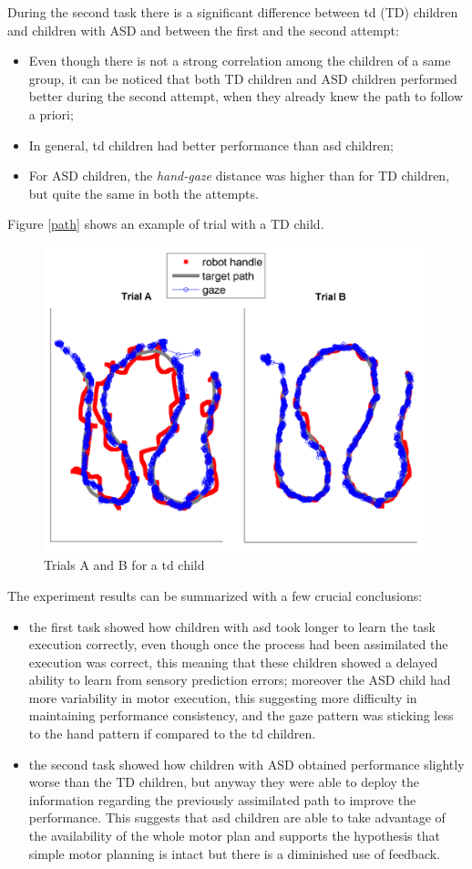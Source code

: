\documentclass[12pt,journal,draftclsnofoot,onecolumn]{IEEEtran}
\makeatletter
\let\origsubsubsection\subsubsection
\renewcommand\subsubsection{\@ifstar{\starsubsubsection}{\nostarsubsubsection}}
\newcommand\nostarsubsubsection[1]
{\subsubsectionprelude\origsubsubsection{#1}}
\newcommand\subsubsectionprelude{%
  \vspace{6pt}
}
\makeatother
\begin{document}
During the second task there is a significant difference between \gls{td} (TD) children and children with ASD and between the first and the second attempt:
\begin{itemize}
\item Even though there is not a strong correlation among the children of a same group, it can be noticed that both TD children and ASD children performed better during the second attempt, when they already knew the path to follow a priori;
\item In general, \gls{td} children had better performance than \gls{asd} children;
\item For ASD children, the \textit{hand-gaze} distance was higher than for TD children, but quite the same in both the attempts.
\end{itemize}

Figure \autoref{path} shows an example of trial with a TD child.

\begin{figure}[t]
\centering
\includegraphics[width = .55\textwidth]{path.png}
\caption{Trials A and B for a \gls{td} child}
\label{path}
\end{figure}

\subsubsection{summary observations}
\label{sec:summary}

The experiment results can be summarized with a few crucial conclusions:
\begin{itemize}
\item the first task showed how children with \gls{asd} took longer to learn the task execution correctly, even though once the process had been assimilated the execution was correct, this meaning that these children showed a delayed ability to learn from sensory prediction errors; moreover the ASD child had more variability in motor execution, this suggesting more difficulty in maintaining performance consistency, and the gaze pattern was sticking less to the hand pattern if compared to the \gls{td} children.
\item the second task showed how children with ASD obtained performance slightly worse than the TD children, but anyway they were able to deploy the information regarding the previously assimilated path to improve the performance. This suggests that \gls{asd} children are able to take advantage of the availability of the whole motor plan and supports the hypothesis that simple motor planning is intact but there is a diminished use of feedback.
\end{itemize}
\end{document}
